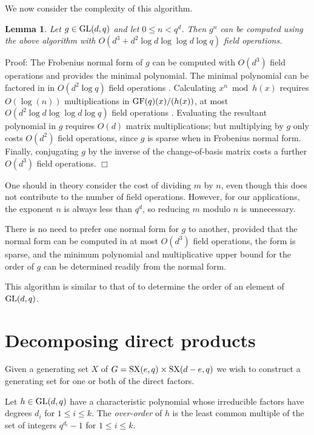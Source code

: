 \documentclass[12pt]{article}
\newtheorem{lemma}[definition]{Lemma}
\newenvironment{proof}{\normalsize {\sc Proof}:}{{\hfill $\Box$ \\}}
\def\GL{{\rm GL}}
\def\GF{{\rm GF}}
\def\SX{{\rm SX}}
\begin{document}
We now consider the complexity of this algorithm.
\begin{lemma}Let $g\in\GL(d,q)$ and let $0\le n<q^d$. Then
$g^n$ can be computed using the above algorithm
with $O(d^3 + d^2 \log d \log \log d \log q)$ field operations.
\end{lemma}
\begin{proof}
The Frobenius normal form of $g$ can be computed with
$O(d^3)$ field operations \cite{Storjohann98}
and provides the minimal polynomial.
The minimal polynomial can be factored in 
in $O(d^2 \log q)$ field operations \cite[Theorem 14.14]{vzg}.
Calculating $x^n \bmod h(x)$ requires $O(\log(n))$
multiplications in $\GF(q)(x)/(h(x))$, 
at most $O(d^2 \log d \log \log d \log q)$ 
field operations \cite{vzg}. Evaluating the resultant polynomial in $g$ requires
$O(d)$ matrix multiplications;  but multiplying by   
$g$ only costs $O(d^2)$ field operations, since $g$ is sparse when 
in Frobenius normal form. Finally, conjugating $g$ by the inverse of 
the change-of-basis matrix costs a further $O(d^3)$ field operations.
\end{proof}

One should in theory consider the cost of
dividing $m$ by $n$, even though this does not 
contribute to the number of field operations. 
However, for our applications, the exponent $n$ 
is always less than $q^d$, so
reducing $m$ modulo $n$ is unnecessary.

There is no need to prefer one normal form for $g$ to another,
provided that the normal form can be computed in at most $O(d^3)$ field
operations, the form is sparse, and the minimum polynomial
and multiplicative upper bound for the order of $g$
can be determined readily from the normal form.

This algorithm is similar to 
that of \cite{CLG97} to determine 
the order of an element of $\GL(d, q)$.

\section{Decomposing direct products}
\label{Pow}

Given a generating set $X$ of $G=\SX(e,q)\times\SX(d-e,q)$ we
wish to construct a generating set for one or both of the direct factors.

Let $h\in\GL(d,q)$ have a characteristic
polynomial whose irreducible factors have degrees $d_i$ for $1\le i\le
k$. The {\it over-order} of $h$ is the least common multiple
of the set of integers $q^{d_i}-1$ for  $1\le i\le k$. 
\end{document}
